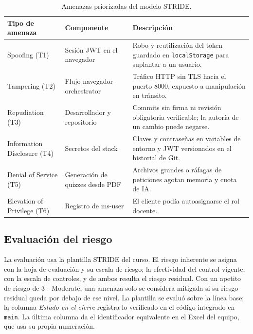 \documentclass[12pt,a4paper]{article}
\begin{document}
\begin{table}[htbp]
  \centering
  \caption{Amenazas priorizadas del modelo STRIDE.}
  \label{tab:top-stride}
  \small
  \begin{tabularx}{\textwidth}{L{2.6cm}L{3.4cm}Y}
    \toprule
    \textbf{Tipo de amenaza} & \textbf{Componente} & \textbf{Descripción} \\
    \midrule
    Spoofing (T1) & Sesión JWT en el navegador & Robo y reutilización del token guardado en
    \texttt{localStorage} para suplantar a un usuario. \\
    \addlinespace
    Tampering (T2) & Flujo navegador--orchestrator & Tráfico HTTP sin TLS hacia el puerto 8000,
    expuesto a manipulación en tránsito. \\
    \addlinespace
    Repudiation (T3) & Desarrollador y repositorio & Commits sin firma ni revisión obligatoria
    verificable; la autoría de un cambio puede negarse. \\
    \addlinespace
    Information Disclosure (T4) & Secretos del stack & Claves y contraseñas en variables de
    entorno y JWT versionados en el historial de Git. \\
    \addlinespace
    Denial of Service (T5) & Generación de quizzes desde PDF & Archivos grandes o ráfagas de
    peticiones agotan memoria y cuota de IA. \\
    \addlinespace
    Elevation of Privilege (T6) & Registro de ms-user & El cliente podía autoasignarse el rol
    docente. \\
    \bottomrule
  \end{tabularx}
\end{table}

\subsection{Evaluación del riesgo}

La evaluación usa la plantilla STRIDE del curso. El riesgo inherente se asigna con la hoja de
evaluación y su escala de riesgo; la efectividad del control vigente, con la escala de controles, y
de ambos resulta el riesgo residual. Con un apetito de riesgo de 3 - Moderate, una amenaza solo se
considera mitigada si su riesgo residual queda por debajo de ese nivel. La plantilla se evaluó sobre
la línea base; la columna \emph{Estado en el cierre} registra lo verificado en el código integrado
en \texttt{main}. La última columna da el identificador equivalente en el Excel del equipo, que usa
su propia numeración.
\end{document}
